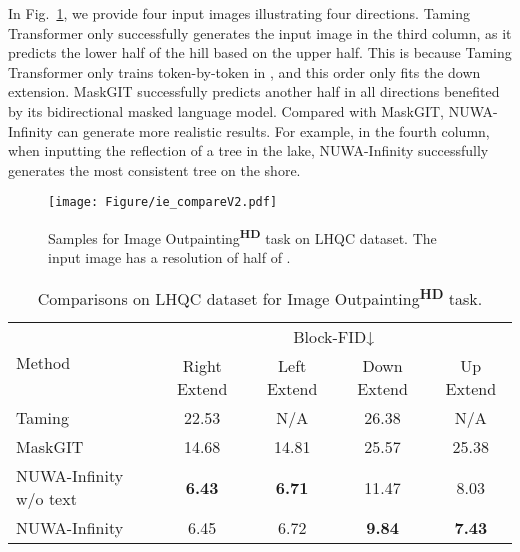 \documentclass{article}
\begin{document}
In Fig.~\ref{fig:vis_ie}, we provide four input images illustrating four directions. Taming Transformer only successfully generates the input image in the third column, as it predicts the lower half of the hill based on the upper half. This is because Taming Transformer only trains token-by-token in , and this order only fits the down extension. MaskGIT successfully predicts another half in all directions benefited by its bidirectional masked language model. Compared with MaskGIT, NUWA-Infinity can generate more realistic results. For example, in the fourth column, when inputting the reflection of a tree in the lake, NUWA-Infinity successfully generates the most consistent tree on the shore.
\begin{figure}[t!]
    \centering
    \texttt{[image: Figure/ie\_compareV2.pdf]}
    \caption{Samples for Image Outpainting\textsuperscript{\textbf{HD}} task on LHQC dataset. The input image has a resolution of half of .}
    \vspace{-4mm}
    \label{fig:vis_ie}
\end{figure}
\begin{table}[htbp]
\small
\begin{tabular}{lcccc}
\toprule
\multirow{2}{*}{Method} & \multicolumn{4}{c}{Block-FID↓}                                \\ \cmidrule{2-5} 
                        & Right Extend    & Left Extend    & Down Extend   & Up Extend     \\ 
                        \midrule
Taming \cite{esserTamingTransformersHighResolution2021}                  & 22.53         & N/A           & 26.38         & N/A           \\
MaskGIT \cite{changMaskGITMaskedGenerative2022}                 & 14.68         & 14.81         & 25.57         & 25.38         \\
NUWA-Infinity w/o text      & \textbf{6.43} & \textbf{6.71} & 11.47         & 8.03          \\
NUWA-Infinity       & 6.45          & 6.72          & \textbf{9.84} & \textbf{7.43} \\
\bottomrule
\end{tabular}
\caption{Comparisons on LHQC dataset for Image Outpainting\textsuperscript{\textbf{HD}} task.}
\label{tab:ie}
\end{table}
\end{document}
